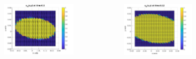 \documentclass[8pt]{beamer}
\begin{document}
\begin{frame}
\begin{columns}
\begin{column}{0.25\textwidth}
			\begin{figure}[h]
				\includegraphics[width=\textwidth]{tc1-2/010.jpg}
			\end{figure}
		\end{column}
		\begin{column}{0.25\textwidth}
			\begin{figure}[h]
				\includegraphics[width=\textwidth]{tc1-2/012.jpg}
			\end{figure}
		\end{column}
		\begin{column}{0.25\textwidth}
			\begin{figure}[h]

\end{figure}
\end{column}
\end{columns}
\end{frame}
\end{document}
